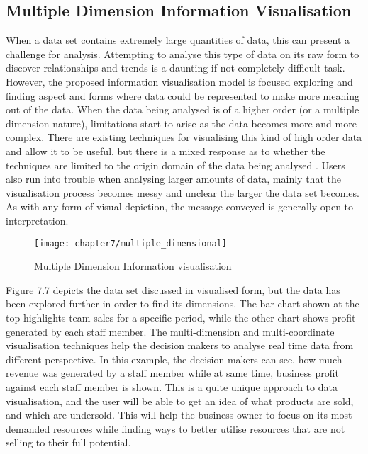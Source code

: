 \subsection{Multiple Dimension Information Visualisation}

When a data set contains extremely large quantities of data, this can present a challenge for analysis. Attempting to analyse this type of data on its raw form to discover relationships and trends is a daunting if not completely difficult task. However, the proposed information visualisation model is focused exploring and finding aspect and forms where data could be represented to make more meaning out of the data. When the data being analysed is of a higher order (or a multiple dimension nature), limitations start to arise as the data becomes more and more complex. There are existing techniques for visualising this kind of high order data and allow it to be useful, but there is a mixed response as to whether the techniques are limited to the origin domain of the data being analysed \cite{keim2002information}. Users also run into trouble when analysing larger amounts of data, mainly that the visualisation process becomes messy and unclear the larger the data set becomes. As with any form of visual depiction, the message conveyed is generally open to interpretation.

\begin{figure}[H]
\centering
\texttt{[image: chapter7/multiple\_dimensional]}
\caption{Multiple Dimension Information visualisation}
\end{figure}

Figure 7.7 depicts the data set discussed in visualised form, but the data has been explored further in order to find its dimensions. The bar chart shown at the top highlights team sales for a specific period, while the other chart shows profit generated by each staff member. The multi-dimension and multi-coordinate visualisation techniques help the decision makers to analyse real time data from different perspective. In this example, the decision makers can see, how much revenue was generated by a staff member while at same time, business profit against each staff member is shown. This is a quite unique approach to data visualisation, and the user will be able to get an idea of what products are sold, and which are undersold. This will help the business owner to focus on its most demanded resources while finding ways to better utilise resources that are not selling to their full potential.

